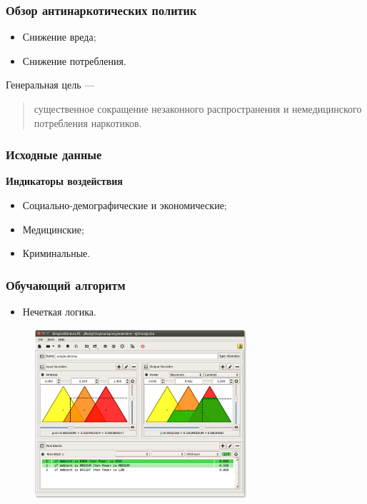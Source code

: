 \documentclass[t]{beamer}  %
\begin{document}
\begin{frame}
    \frametitle{Обзор антинаркотических политик}%
	\begin{itemize}
        \item Снижение вреда;
        \item Снижение потребления.
	\end{itemize}
    Генеральная цель ---
    \begin{quote}
        существенное сокращение незаконного распространения и немедицинского 
        потребления наркотиков. 
    \end{quote}
\end{frame}
\begin{frame}
    \frametitle{Исходные данные}
    \textbf{Индикаторы воздействия}
    \begin{itemize}
    \item Социально-демографические и экономические;
    \item Медицинские;
    \item Криминальные.
    \end{itemize}
\end{frame}
\begin{frame}
    \frametitle{Обучающий алгоритм} 
	\begin{itemize}
        \item Нечеткая логика.
	\end{itemize}

    \begin{figure}
        \centering
        \includegraphics[width=0.7\textwidth]{simple_dimmer_fl.png}
    \end{figure}
\end{frame}
\end{document}
